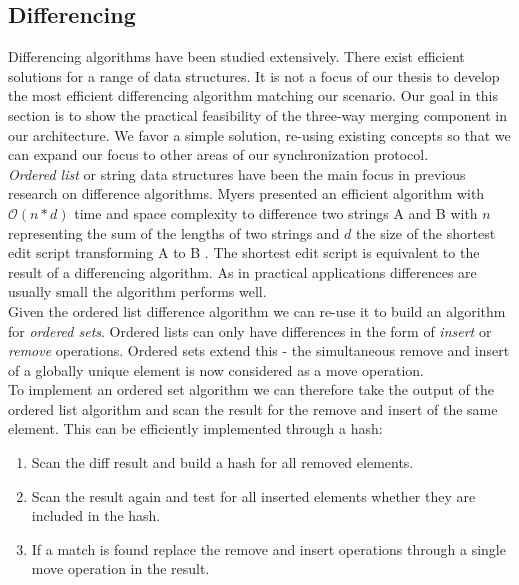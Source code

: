 \subsection{Differencing}
\label{sec:histo.merging.diff}
Differencing algorithms have been studied extensively.
There exist efficient solutions for a range of data structures.
It is not a focus of our thesis to develop the most efficient differencing algorithm matching our scenario.
Our goal in this section is to show the practical feasibility of the three-way merging component in our architecture.
We favor a simple solution, re-using existing concepts so that we can expand our focus to other areas of our synchronization protocol.\\

\emph{Ordered list} or string data structures have been the main focus in previous research on difference algorithms.
Myers presented an efficient algorithm with $\mathcal O(n*d) $ time and space complexity to difference two strings A and B with
$ n $ representing the sum of the lengths of two strings and $ d $ the size of the shortest edit script transforming A to B \cite{Myers:1986wi}.
The shortest edit script is equivalent to the result of a differencing algorithm.
As in practical applications differences are usually small the algorithm performs well.\\

Given the ordered list difference algorithm we can re-use it to build an algorithm for \emph{ordered sets}.
Ordered lists can only have differences in the form of \emph{insert} or \emph{remove} operations.
Ordered sets extend this - the simultaneous remove and insert of a globally unique element is now considered as a move operation.\\
To implement an ordered set algorithm we can therefore take the output of the ordered list algorithm and scan the result for the remove and insert of the same element.
This can be efficiently implemented through a hash:

\begin{enumerate}
\item Scan the diff result and build a hash for all removed elements.
\item Scan the result again and test for all inserted elements whether they are included in the hash.
\item If a match is found replace the remove and insert operations through a single move operation in the result.
\end{enumerate}


